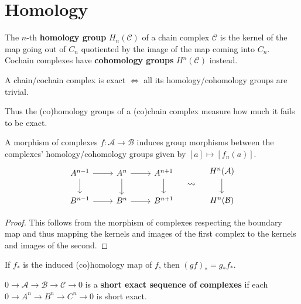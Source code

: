 \documentclass[twoside,10pt]{report}
\begin{document}
\section{Homology}

\begin{defn}[]
	The $n$-th \textbf{homology group} $H_{n}(\mathcal{C})$ of a chain complex $\mathcal{C}$ is the kernel of the map going out of $C_{n}$ quotiented by the image of the map coming into $C_{n}$. Cochain complexes have \textbf{cohomology groups} $H^{n}(\mathcal{C})$ instead.
\end{defn}

\begin{prop}
A chain/cochain complex is exact $\iff$ all its homology/cohomology groups are trivial.
\end{prop}

Thus the (co)homology groups of a (co)chain complex measure how much it fails to be exact.

\begin{prop}
	A morphism of complexes $f:\mathcal{A}\to \mathcal{B}$ induces group morphisms between the complexes' homology/cohomology groups given by $[a] \mapsto [f_{n}(a)]$.
\[
\begin{aligned}
	\begin{tikzcd}
		A^{n-1} \rar\dar & A^{n} \rar\dar & A^{n+1} \dar \\
		B^{n-1} \rar & B^{n} \rar & B^{n+1}
	\end{tikzcd}
	\quad \leadsto \quad
	\begin{tikzcd}
		H^{n}(\mathcal{A}) \dar \\
		H^{n}(\mathcal{B})
	\end{tikzcd}
\end{aligned}
\] 
\end{prop}
\begin{proof}
	This follows from the morphism of complexes respecting the boundary map and thus mapping the kernels and images of the first complex to the kernels and images of the second.
\end{proof}

\begin{prop}
	If $f_{*}$ is the induced (co)homology map of $f$, then $(gf)_{*}=g_{*}f_{*}$.
\end{prop}

\begin{defn}[]
$0\to \mathcal{A}\to \mathcal{B}\to \mathcal{C}\to 0$ is a \textbf{short exact sequence of complexes} if each $0\to A^{n}\to B^{n}\to C^{n}\to 0$ is short exact.
\end{defn}
\end{document}
